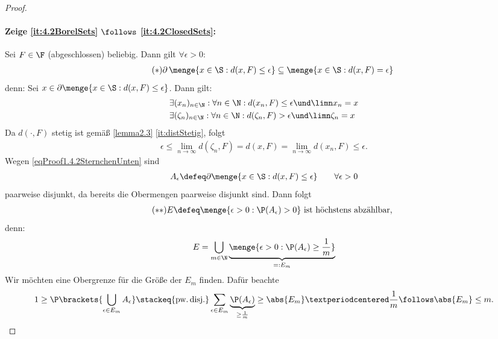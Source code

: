 \begin{proof}
	\paragraph{Zeige \ref{it:4.2BorelSets} $\follows$ \ref{it:4.2ClosedSets}:}
	Sei $F\in\F$ (abgeschlossen) beliebig. Dann gilt $\forall\epsilon>0:$
	\begin{align}\label{eqProof1.4.2SternchenUnten}\tag{$\ast$}
		\partial\,\menge{ x\in\S:d(x,F)\le\epsilon}
		\subseteq\menge{ x\in\S:d(x,F)=\epsilon}
	\end{align}
	denn: Sei $x\in\partial\menge{ x\in\S:d(x,F)\le\epsilon}$. Dann gilt:
	\begin{align*}
		&\exists (x_n)_{n\in\N}:\forall n\in\N:d(x_n,F)\le\epsilon\und \limn x_n=x\\
		&\exists (\zeta_n)_{n\in\N}:\forall n\in\N:d(\zeta_n,F)>\epsilon\und \limn \zeta_n=x
	\end{align*}
	Da $d(·,F)$ stetig ist gemäß \ref{lemma2.3} \ref{it:distStetig}, folgt
	\begin{align*}
		\epsilon \le \lim_{n \to \infty} d(\zeta_n, F) = d(x,F) = \lim_{n \to \infty} d(x_n, F) \le \epsilon.
	\end{align*}
	Wegen \eqref{eqProof1.4.2SternchenUnten} sind
	\begin{align*}
		A_\epsilon\defeq\partial\menge{ x\in\S:d(x,F)\le\epsilon}\qquad\forall\epsilon>0
	\end{align*}
	paarweise disjunkt, da bereits die Obermengen paarweise disjunkt sind. Dann folgt
	\begin{align}\label{eqProof1.4.2DoppelSternchenUnten}\tag{$\ast\ast$}
		E\defeq\menge{\epsilon>0:\P(A_\epsilon)>0}\text{ ist höchstens abzählbar},
	\end{align}
	denn:
	\begin{align*}
		E=\bigcup_{m \in \N} \underbrace{\menge{\epsilon>0: \P(A_\epsilon) \ge \frac1m}}_{=:E_m}
	\end{align*}
	Wir möchten eine Obergrenze für die Größe der $E_m$ finden. Dafür beachte
	\begin{align*}
		1\ge \P\brackets{\bigcup_{\epsilon \in E_m} A_{\epsilon}}
		\stackeq{\text{pw.\,disj.}}
		\sum_{\epsilon \in E_m}\underbrace{\P(A_{\epsilon})}_{\ge\frac{1}{m}} \ge \abs{E_m}·\frac{1}{m} \follows \abs{E_m} \le m.
	\end{align*}

\end{proof}
